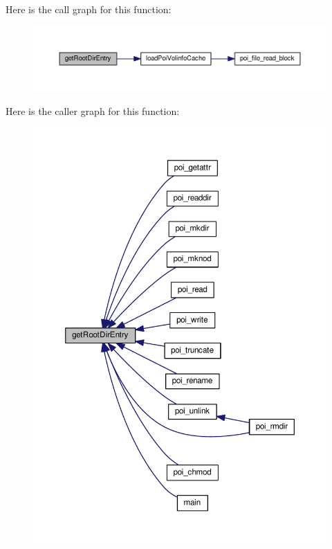 Here is the call graph for this function\-:\nopagebreak
\begin{figure}[H]
\begin{center}
\leavevmode
\includegraphics[width=350pt]{volume-information_8h_a32c12de0ce0f231386676aca679e459e_cgraph}
\end{center}
\end{figure}




Here is the caller graph for this function\-:
\nopagebreak
\begin{figure}[H]
\begin{center}
\leavevmode
\includegraphics[width=350pt]{volume-information_8h_a32c12de0ce0f231386676aca679e459e_icgraph}
\end{center}
\end{figure}


